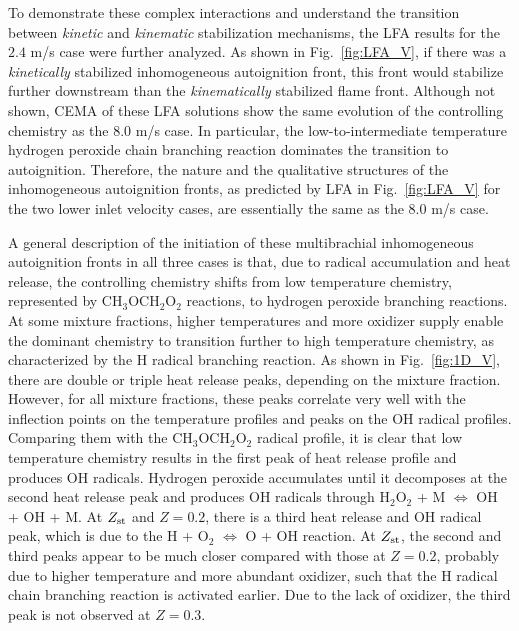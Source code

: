 \documentclass[review,3p,times]{elsarticle}
\begin{document}
To demonstrate these complex interactions and understand the transition between \emph{kinetic} and \emph{kinematic} stabilization mechanisms, the LFA results for the $2.4$ m/s case were further analyzed.  As shown in Fig.~\ref{fig:LFA_V}, if there was a \emph{kinetically} stabilized inhomogeneous autoignition front, this front would stabilize further downstream than the \emph{kinematically} stabilized flame front.  Although not shown, CEMA of these LFA solutions show the same evolution of the controlling chemistry as the $8.0$ m/s case.  In particular, the low-to-intermediate temperature hydrogen peroxide chain branching reaction dominates the transition to autoignition.  Therefore, the nature and the qualitative structures of the inhomogeneous autoignition fronts, as predicted by LFA in Fig.~\ref{fig:LFA_V} for the two lower inlet velocity cases, are essentially the same as the $8.0$ m/s case.  

A general description of the initiation of these multibrachial inhomogeneous autoignition fronts in all three cases is that, due to radical accumulation and heat release, the controlling chemistry shifts from low temperature chemistry, represented by CH$_3$OCH$_2$O$_2$ reactions, to hydrogen peroxide branching reactions.  At some mixture fractions, higher temperatures and more oxidizer supply enable the dominant chemistry to transition further to high temperature chemistry, as characterized by the H radical branching reaction.  As shown in Fig.~\ref{fig:1D_V}, there are double or triple heat release peaks, depending on the mixture fraction.  However, for all mixture fractions, these peaks correlate very well with the inflection points on the temperature profiles and peaks on the OH radical profiles.  Comparing them with the CH$_3$OCH$_2$O$_2$ radical profile, it is clear that low temperature chemistry results in the first peak of heat release profile and produces OH radicals.  Hydrogen peroxide accumulates until it decomposes at the second heat release peak and produces OH radicals through H$_2$O$_2$ + M $\Longleftrightarrow$ OH + OH + M.  At $Z_{\rm st}$ and $Z = 0.2$, there is a third heat release and OH radical peak, which is due to the H + O$_2$ $\Longleftrightarrow$ O + OH reaction.  At $Z_{\rm st}$, the second and third peaks appear to be much closer compared with those at $Z = 0.2$, probably due to higher temperature and more abundant oxidizer, such that the H radical chain branching reaction is activated earlier.  Due to the lack of oxidizer, the third peak is not observed at $Z = 0.3$.  
\end{document}

